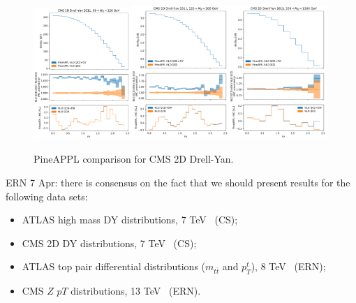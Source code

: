 \begin{figure}
    \includegraphics[width=0.33\textwidth]{figures/pineappl_CMSDY2D11_bin4}\includegraphics[width=0.33\textwidth]{figures/pineappl_CMSDY2D11_bin5}\includegraphics[width=0.33\textwidth]{figures/pineappl_CMSDY2D11_bin6}
    \caption{PineAPPL comparison for CMS 2D Drell-Yan.}
    \label{fig:cmsdy2d11}
\end{figure}

ERN 7 Apr: there is consensus on the fact that we should present results for the
following data sets:
\begin{itemize}
\item ATLAS high mass DY distributions, 7 TeV~\cite{Aad:2013iua} (CS);
\item CMS 2D DY distributions, 7 TeV~\cite{Chatrchyan:2013tia} (CS);
\item ATLAS top pair differential distributions ($m_{t\bar{t}}$ and $p_T^t$),
8 TeV~\cite{Aad:2015mbv} (ERN);
\item CMS $Z$ $pT$ distributions, 13 TeV~\cite{Sirunyan:2019bzr} (ERN).
\end{itemize}

